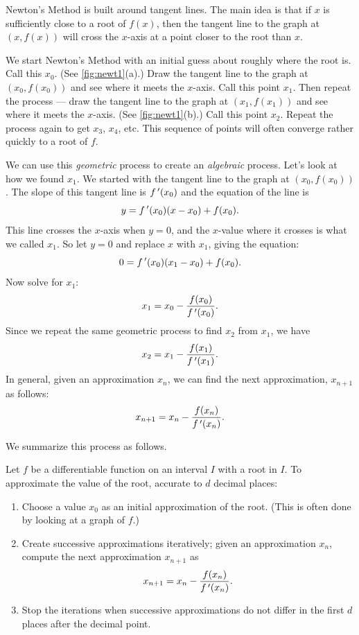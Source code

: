 Newton's Method is built around tangent lines.  The main idea is that if $x$ is sufficiently close to a root of $f(x)$, then the  tangent line to the graph at $(x,f(x))$ will cross the $x$-axis at a point closer to the root than $x$.  

We start Newton's Method with an initial guess about roughly where the root is.  Call this $x_0$. (See \autoref{fig:newt1}(a).)  Draw the tangent line to the graph at $(x_0,f(x_0))$ and see where it meets the $x$-axis. Call this point $x_1$.  Then repeat the process --- draw the tangent line to the graph at $(x_1, f(x_1))$ and see where it meets the $x$-axis. (See \autoref{fig:newt1}(b).) Call this point $x_2$.  Repeat the process again to get $x_3$, $x_4$, etc.  This sequence of points will often converge rather quickly to a root of $f$.  

We can use this \emph{geometric} process to create an \emph{algebraic} process.  Let's look at how we found $x_1$.  We started with the tangent line to the graph at $(x_0,f(x_0))$.  The slope of this tangent line is $f\,'(x_0)$ and the equation of the line is
\[y=f\,'(x_0)(x-x_0)+f(x_0).\]
This line crosses the $x$-axis when $y=0$, and the $x$-value where it crosses is what we called $x_1$. So let $y=0$ and replace $x$ with $x_1$, giving the equation: 
\[ 0 = f\,'(x_0)(x_1-x_0)+f(x_0).\] 
Now solve for $x_1$:
\[x_1=x_0-\frac{f(x_0)}{f\,'(x_0)}.\]
Since we repeat the same geometric process to find $x_2$ from $x_1$, we have
\[x_2=x_1-\frac{f(x_1)}{f\,'(x_1)}.\]
In general, given an approximation $x_n$, we can find the next approximation, $x_{n+1}$ as follows:
\[x_{n+1} = x_{n} - \frac{f(x_{n})}{f\,'(x_{n})}.\]

We summarize this process as follows.

\begin{keyidea}\label{idea:Newton}%
Let $f$ be a differentiable function on an interval $I$ with a root in $I$. To approximate the value of the root, accurate to $d$ decimal places:
\begin{enumerate}
	\item		Choose a value $x_0$ as an initial approximation of the root. (This is often done by looking at a graph of $f$.)
	\item		Create successive approximations iteratively; given an approximation $x_n$, compute the next approximation $x_{n+1}$ as
	\[x_{n+1} = x_n - \frac{f(x_n)}{f\,'(x_n)}.\]
	\item		Stop the iterations when successive approximations do not differ in the first $d$ places after the decimal point.
\end{enumerate}
\end{keyidea}

